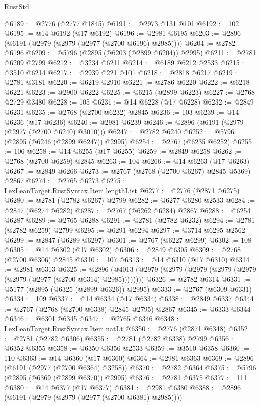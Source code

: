 \begin{lexlean}{RustStd}
\begin{coremodule}
@6189 := @2776 (@2777 @1845)
@6191 := @2973 @131 @101
@6192 := 102
@6195 := @14 @6192 (@17 @6192)
@6196 := @2981 @6195
@6203 := @2896 (@6191 (@2979 (@2979 (@2977 (@2700 @6196) @2985))))
@6204 := @2782 @6196
@6209 := @5796 (@2895 (@6203 (@2899 @6204)) @2995)
@6211 := @2781 @6209 @2799
@6212 := @3234 @6211
@6214 := @6189 @6212 @2533
@6215 := @3510 @6214
@6217 := @2939 @221 @101
@6218 := @2818 @6217
@6219 := @2781 @3181
@6220 := @6219 @2910
@6221 := @2786 @6220
@6222 := @6218 @6221
@6223 := @2900 @6222
@6225 := @6215 (@2899 @6223)
@6227 := @2768 @2729 @3480
@6228 := 105
@6231 := @14 @6228 (@17 @6228)
@6232 := @2849 @6231
@6235 := @2768 (@2700 @6232) @2845
@6236 := 103
@6239 := @14 @6236 (@17 @6236)
@6240 := @2981 @6239
@6246 := @2896 (@6191 (@2979 (@2977 (@2700 @6240) @3010)))
@6247 := @2782 @6240
@6252 := @5796 (@2895 (@6246 (@2899 @6247)) @2995)
@6254 := @2767 (@6235 @6252)
@6255 := 106
@6258 := @14 @6255 (@17 @6255)
@6259 := @2849 @6258
@6262 := @2768 (@2700 @6259) @2845
@6263 := 104
@6266 := @14 @6263 (@17 @6263)
@6267 := @2849 @6266
@6273 := @2767 (@2768 (@2700 @6267) @2845 @5369) @2867
@6274 := @2765 @6273
@6275 := LexLeanTarget.RustSyntax.Item.lengthList
@6277 := @2776 (@2871 @6275)
@6280 := @2781 (@2782 @6267) @2799
@6282 := @6277 @6280 @2533
@6284 := @2847 (@6274 @6282)
@6287 := @2767 (@6262 @6284) @2867
@6288 := @6254 @6287
@6289 := @2765 @6288
@6291 := @2781 (@2782 @6232)
@6294 := @2781 (@2782 @6259) @2799
@6295 := @6291 @6294
@6297 := @3714 @6295 @2562
@6299 := @2847 (@6289 @6297)
@6301 := @2767 (@6227 @6299)
@6302 := 108
@6305 := @14 @6302 (@17 @6302)
@6306 := @2849 @6305
@6309 := @2768 (@2700 @6306) @2845
@6310 := 107
@6313 := @14 @6310 (@17 @6310)
@6314 := @2981 @6313
@6325 := @2896 (@4013 (@2979 (@2979 (@2979 (@2979 (@2979 (@2979 (@2977 (@2700 @6314) @2985))))))))
@6326 := @2782 @6314
@6331 := @5177 (@2895 (@6325 (@2899 @6326)) @2995)
@6333 := @2767 (@6309 @6331)
@6334 := 109
@6337 := @14 @6334 (@17 @6334)
@6338 := @2849 @6337
@6344 := @2767 (@2768 (@2700 @6338) @2845 @2795) @2867
@6345 := @6333 @6344
@6346 := @6301 @6345
@6347 := @2765 @6346
@6348 := LexLeanTarget.RustSyntax.Item.natLt
@6350 := @2776 (@2871 @6348)
@6352 := @2781 (@2782 @6306)
@6355 := @2781 (@2782 @6338) @2799
@6356 := @6352 @6355
@6358 := @6350 @6356 @2533
@6359 := @3510 @6358
@6360 := 110
@6363 := @14 @6360 (@17 @6360)
@6364 := @2981 @6363
@6369 := @2896 (@6191 (@2977 (@2700 @6364) @3258))
@6370 := @2782 @6364
@6375 := @5796 (@2895 (@6369 (@2899 @6370)) @2995)
@6376 := @2781 @6375
@6377 := 111
@6380 := @14 @6377 (@17 @6377)
@6381 := @2981 @6380
@6388 := @2896 (@6191 (@2979 (@2979 (@2977 (@2700 @6381) @2985))))

\end{coremodule}
\end{lexlean}
